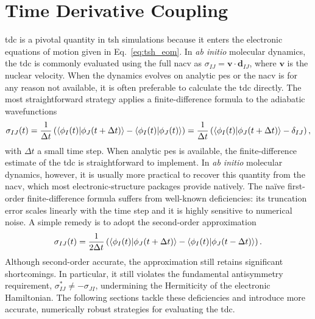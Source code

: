 \section{Time Derivative Coupling}\label{sec:time_derivative_coupling}
\gls{tdc} is a pivotal quantity in \gls{tsh} simulations because it enters the electronic equations of motion given in Eq.~\eqref{eq:tsh_eom}. In \textit{ab initio} molecular dynamics, the \gls{tdc} is commonly evaluated using the full \gls{nacv} as $\sigma_{IJ}=\symbf{v}\cdot\symbf{d}_{IJ}$, where $\symbf{v}$ is the nuclear velocity. When the dynamics evolves on analytic \gls{pes} or the \gls{nacv} is for any reason not available, it is often preferable to calculate the \gls{tdc} directly. The most straightforward strategy applies a finite-difference formula to the adiabatic wavefunctions
\begin{equation}\label{eq:tdc_fd1}
\sigma_{IJ}(t)=\frac{1}{\Delta t}\left(\Braket{\phi_I(t)\vert\phi_J(t+\Delta t)}-\Braket{\phi_I(t)\vert\phi_J(t)}\right)=\frac{1}{\Delta t}\left(\Braket{\phi_I(t)\vert\phi_J(t+\Delta t)}-\delta_{IJ}\right),
\end{equation}
with $\Delta t$ a small time step. When analytic \gls{pes} is available, the finite-difference estimate of the \gls{tdc} is straightforward to implement. In \textit{ab initio} molecular dynamics, however, it is usually more practical to recover this quantity from the \gls{nacv}, which most electronic-structure packages provide natively. The naïve first-order finite-difference formula suffers from well-known deficiencies: its truncation error scales linearly with the time step and it is highly sensitive to numerical noise. A simple remedy is to adopt the second-order approximation
\begin{equation}\label{eq:tdc_fd2}
\sigma_{IJ}(t)=\frac{1}{2\Delta t}\left(\Braket{\phi_I(t)\vert\phi_J(t+\Delta t)}-\Braket{\phi_I(t)\vert\phi_J(t-\Delta t)}\right).
\end{equation}
Although second-order accurate, the approximation still retains significant shortcomings. In particular, it still violates the fundamental antisymmetry requirement, $\sigma_{IJ}^\ast\neq-\sigma_{JI}$, undermining the Hermiticity of the electronic Hamiltonian. The following sections tackle these deficiencies and introduce more accurate, numerically robust strategies for evaluating the \gls{tdc}.
